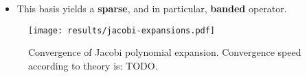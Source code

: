 \begin{itemize}
  \item This basis yields a \textbf{sparse}, and in particular, \textbf{banded} operator.
\end{itemize}

\begin{figure}[H]
  \centering
  \label{fig:jacobi-expansions-error}
  \texttt{[image: results/jacobi-expansions.pdf]}
  \caption{Convergence of Jacobi polynomial expansion. Convergence speed according to theory is: TODO.}
\end{figure}
